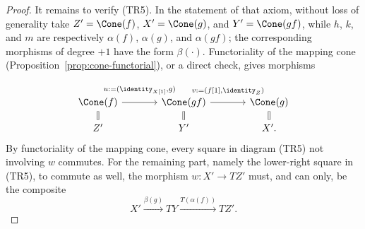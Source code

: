 \begin{proof}
	It remains to verify (TR5). In the statement of that axiom, without loss
	of generality take $Z' = \Cone(f)$, $X' = \Cone(g)$, and
	$Y' = \Cone(gf)$, while $h$, $k$, and $m$ are respectively
	$\alpha(f)$, $\alpha(g)$, and $\alpha(gf)$; the corresponding
	morphisms of degree $+1$ have the form $\beta(\cdot)$. Functoriality of
	the mapping cone (Proposition~\ref{prop:cone-functorial}), or a direct
	check, gives morphisms
	\[\begin{tikzcd}[column sep=large, row sep=small]
		\Cone(f) \arrow[r, "{u := (\identity_{X[1]}, g)}" inner sep=0.8em] & \Cone(gf) \arrow[r, "{v := (f[1], \identity_Z)}" inner sep=0.8em] & \Cone(g) \\
		Z' \arrow[equal, u] & Y' \arrow[equal, u] & X' \arrow[equal, u] .
	\end{tikzcd}\]
	By functoriality of the mapping cone, every square in diagram (TR5) not
	involving $w$ commutes. For the remaining part, namely the lower-right
	square in (TR5), to commute as well, the morphism $w: X' \to TZ'$ must,
	and can only, be the composite
	\[ X' \xrightarrow{\beta(g)} TY \xrightarrow{T(\alpha(f))} T Z' . \]


\end{proof}
